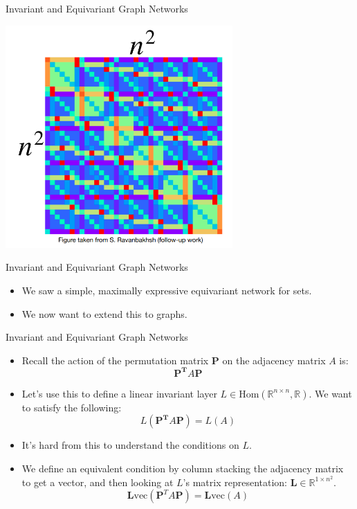 \documentclass{beamer}
\begin{document}
\begin{frame}{Invariant and Equivariant Graph Networks}
    \begin{center}
        \includegraphics[width=0.65\textwidth]{../figures/2-tensor-eq.png}
    \end{center}
\end{frame}
\begin{frame}{Invariant and Equivariant Graph Networks}
    \begin{itemize}
        \setlength{\itemsep}{\fill}
        \item We saw a simple, maximally expressive equivariant network for sets.
        \pause
        \item We now want to extend this to graphs.
    \end{itemize}
\end{frame}
\begin{frame}{Invariant and Equivariant Graph Networks}
    \begin{itemize}
        \setlength{\itemsep}{\fill}
        \item Recall the action of the permutation matrix $\boldsymbol{P}$ on the adjacency matrix $A$ is:
        \[\boldsymbol{P^T}A\boldsymbol{P}\]
        \pause
        \item Let's use this to define a linear invariant layer $L \in \text{Hom}(\mathbb{R}^{n\times n}, \mathbb{R})$. We want to satisfy the following:
        \[ L(\boldsymbol{P^T}A\boldsymbol{P}) = L(A) \]
        \item It's hard from this to understand the conditions on $L$. 
        \pause
        \item We define an equivalent condition by column stacking the adjacency matrix to get a vector, and then looking at $L$'s matrix representation: $\mathbf{L} \in \mathbb{R}^{1 \times n^2}$.
        \[ \mathbf{L}\text{vec}(\boldsymbol{P}^T A\boldsymbol{P}) = \mathbf{L}\text{vec}(A) \]
        \pause
    \end{itemize}
\end{frame}
\end{document}
